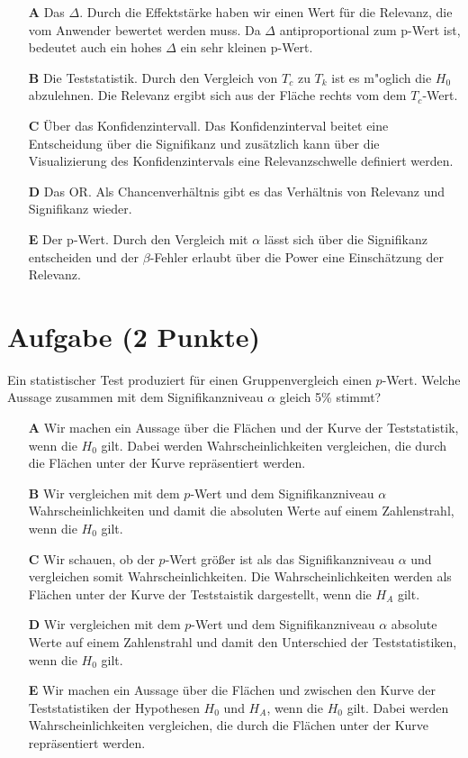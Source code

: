 \documentclass[a4paper, 9pt]{scrartcl}\usepackage[]{graphicx}\usepackage[]{xcolor}
\begin{document}
\begin{enumerate}
\item [\textbf{A} \msquare] Das $\Delta$. Durch die Effektstärke haben wir einen Wert für die Relevanz, die vom Anwender bewertet werden muss. Da $\Delta$ antiproportional zum p-Wert ist, bedeutet auch ein hohes $\Delta$ ein sehr kleinen p-Wert.
\item [\textbf{B} \msquare] Die Teststatistik. Durch den Vergleich von $T_c$ zu $T_k$ ist es m{"o}glich die $H_0$ abzulehnen. Die Relevanz ergibt sich aus der Fläche rechts vom dem $T_c$-Wert.
\item [\textbf{C} \msquare] Über das Konfidenzintervall. Das Konfidenzinterval beitet eine Entscheidung über die Signifikanz und zusätzlich kann über die Visualizierung des Konfidenzintervals eine Relevanzschwelle definiert werden.
\item [\textbf{D} \msquare] Das OR. Als Chancenverhältnis gibt es das Verhältnis von Relevanz und Signifikanz wieder.
\item [\textbf{E} \msquare] Der p-Wert. Durch den Vergleich mit $\alpha$ lässt sich über die Signifikanz entscheiden und der $\beta$-Fehler erlaubt über die Power eine Einschätzung der Relevanz.
\end{enumerate}

\section{Aufgabe \hfill (2 Punkte)}



Ein statistischer Test produziert für einen Gruppenvergleich einen $p$-Wert. Welche Aussage zusammen mit dem Signifikanzniveau $\alpha$ gleich 5\% stimmt?



\begin{enumerate}
\item [\textbf{A} \msquare] Wir machen ein Aussage über die Flächen und der Kurve der Teststatistik, wenn die $H_0$ gilt. Dabei werden Wahrscheinlichkeiten vergleichen, die durch die Flächen unter der Kurve repräsentiert werden.
\item [\textbf{B} \msquare] Wir vergleichen mit dem $p$-Wert und dem Signifikanzniveau $\alpha$ Wahrscheinlichkeiten und damit die absoluten Werte auf einem Zahlenstrahl, wenn die $H_0$ gilt.
\item [\textbf{C} \msquare] Wir schauen, ob der $p$-Wert größer ist als das Signifikanzniveau $\alpha$ und vergleichen somit Wahrscheinlichkeiten. Die Wahrscheinlichkeiten werden als Flächen unter der Kurve der Teststaistik dargestellt, wenn die $H_A$ gilt.
\item [\textbf{D} \msquare] Wir vergleichen mit dem $p$-Wert und dem Signifikanzniveau $\alpha$ absolute Werte auf einem Zahlenstrahl und damit den Unterschied der Teststatistiken, wenn die $H_0$ gilt.
\item [\textbf{E} \msquare] Wir machen ein Aussage über die Flächen und zwischen den Kurve der Teststatistiken der Hypothesen $H_0$ und $H_A$, wenn die $H_0$ gilt. Dabei werden Wahrscheinlichkeiten vergleichen, die durch die Flächen unter der Kurve repräsentiert werden.
\end{enumerate}
\end{document}
